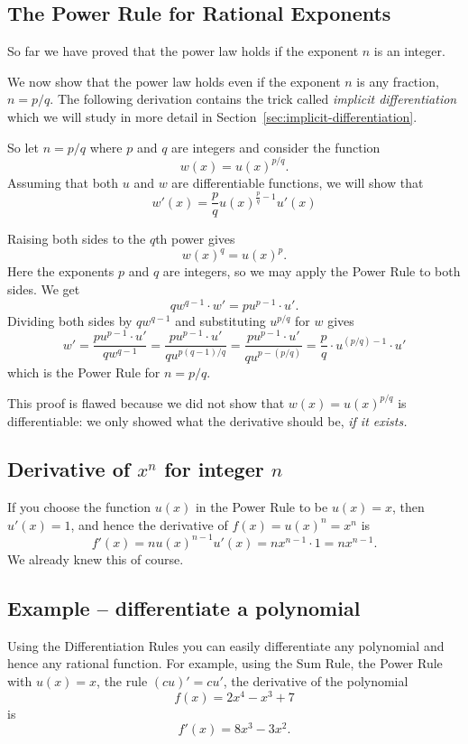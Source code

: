 \subsection{The Power Rule for Rational Exponents}
So far we have proved that the power law holds if the exponent $n$ is an
integer.

We now show that the power law holds even if the exponent $n$ is any
fraction, $n=p/q$.  The following derivation contains the trick called
\emph{implicit differentiation} which we will study in more detail in
Section~\ref{sec:implicit-differentiation}.

So let $n=p/q$ where $p$ and $q$ are integers and consider the function
\[
w(x)=u(x)^{p/q}.
\]
Assuming that both $u$ and $w$ are differentiable functions, we will show that
\begin{equation}\label{eq:power-rule-rational-exponents}
  w'(x) = \frac pq u(x)^{\frac pq-1}u'(x)
\end{equation}


Raising both sides to the $q$th power gives
\[
w(x)^q=u(x)^p.
\]
Here the exponents $p$ and $q$ are integers, so we may apply the Power Rule
to both sides.  We get
\[
qw^{q-1}\cdot w'=pu^{p-1}\cdot u'.
\]
Dividing both sides by $qw^{q-1}$ and substituting $u^{p/q}$ for $w$ gives
\[
w'= \frac{pu^{p-1}\cdot u'}{qw^{q-1}}=
\frac{pu^{p-1}\cdot u'}{qu^{p(q-1)/q}}=
\frac{pu^{p-1}\cdot u'}{qu^{p-(p/q)}}=
\frac{p}{q}\cdot u^{(p/q)-1}\cdot u'
\]
which is the Power Rule for $n=p/q$.


This proof is flawed because we did not show that $w(x) = u(x)^{p/q}$ is
differentiable:  we only showed what the derivative should be,
\textit{if it exists. }




\subsection{Derivative of $x^n$ for integer $n$}
If you choose the function $u(x)$ in the Power Rule to be $u(x) = x$, then
$u'(x) = 1$, and hence the derivative of $f(x) = u(x)^n = x^n$ is
\[
f'(x)
= nu(x)^{n-1} u'(x)
= nx^{n-1}\cdot 1
= nx^{n-1}.
\]
We already knew this of course.



\subsection{Example -- differentiate a polynomial}
Using the Differentiation Rules you can easily differentiate any polynomial and
hence any rational function.  For example, using the Sum Rule, the Power Rule
with $u(x)=x$, the rule $(cu)'=cu'$, the derivative of the polynomial
\[
f(x)= 2x^4-x^3+7
\]
is
\[
f'(x)=8x^3-3x^2.
\]

